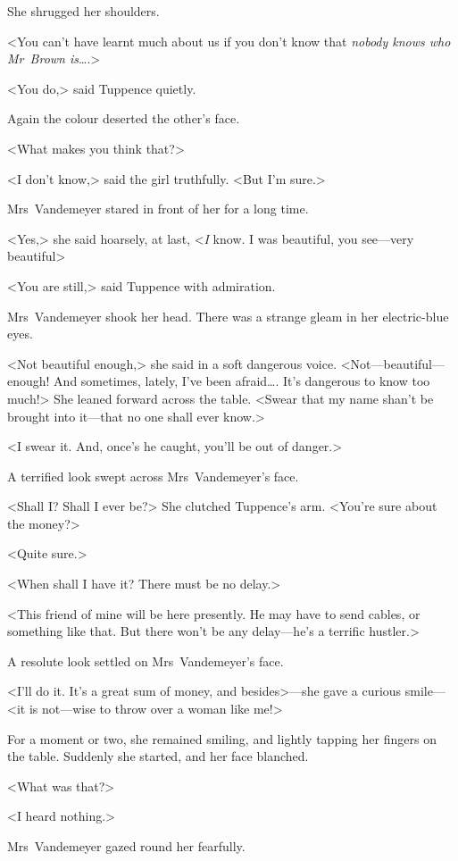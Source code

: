 She shrugged her shoulders.

<You can't have learnt much about us if you don't know that \emph{nobody knows who Mr~Brown is}\dots.>

<You do,> said Tuppence quietly.

Again the colour deserted the other's face.

<What makes you think that?>

<I don't know,> said the girl truthfully. <But I'm sure.>

Mrs~Vandemeyer stared in front of her for a long time.

<Yes,> she said hoarsely, at last, <\emph{I} know. I was beautiful, you see—very beautiful\longdash>

<You are still,> said Tuppence with admiration.

Mrs~Vandemeyer shook her head. There was a strange gleam in her electric-blue eyes.

<Not beautiful enough,> she said in a soft dangerous voice. <Not—beautiful—enough! And sometimes, lately, I've been afraid\dots. It's dangerous to know too much!> She leaned forward across the table. <Swear that my name shan't be brought into it—that no one shall ever know.>

<I swear it. And, once's he caught, you'll be out of danger.>

A terrified look swept across Mrs~Vandemeyer's face.

<Shall I? Shall I ever be?> She clutched Tuppence's arm. <You're sure about the money?>

<Quite sure.>

<When shall I have it? There must be no delay.>

<This friend of mine will be here presently. He may have to send cables, or something like that. But there won't be any delay—he's a terrific hustler.>

A resolute look settled on Mrs~Vandemeyer's face.

<I'll do it. It's a great sum of money, and besides>—she gave a curious smile—<it is not—wise to throw over a woman like me!>

For a moment or two, she remained smiling, and lightly tapping her fingers on the table. Suddenly she started, and her face blanched.

<What was that?>

<I heard nothing.>

Mrs~Vandemeyer gazed round her fearfully.

